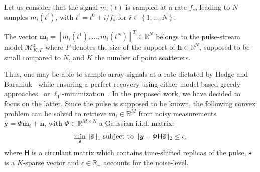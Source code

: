 \documentclass{article}
\newcommand{\vect}[1]{\bm{#1}}
\newcommand{\mat}[1]{\mathsf{#1}}
\newcommand{\ser}[2]{#1^{#2}}
\theoremstyle{definition}
\begin{document}
Let us consider that the signal $m_i \left(t\right)$ is sampled at a rate $f_s$, leading to $N$ samples $ m_i \left(\ser{t}{i}\right)$, with $\ser{t}{i}= \ser{t}{0} + i/f_s$ for $i \in \left\lbrace 1,\dots,N \right\rbrace$.

The vector $\vect{m}_i = \left[m_i\left(\ser{t}{1}\right),\dots,m_i\left(\ser{t}{N}\right)\right]^T \in \mathbb{R}^N$ belongs to the pulse-stream model $\mathcal{M}^z_{K,F}$ where $F$ denotes the size of the support of $\vect{h} \in \mathbb{R}^N$, supposed to be small compared to $N$, and $K$ the number of point scatterers.

Thus, one may be able to sample array signals at a rate dictated by Hedge and Baraniuk~\cite{Hedge_TSP_2011} while ensuring a perfect recovery using either model-based greedy approaches~\cite{Baraniuk2010} or $\ell_1$-minimization~\cite{candes11}. 
In the proposed work, we have decided to focus on the latter. Since the pulse is supposed to be known, the following convex problem can be solved to retrieve $\vect{m}_i \in \mathbb{R}^M$ from noisy measurements $\vect{y} = \mathsf{\Phi} \vect{m}_i + \vect{n}$, with $\mathsf{\Phi} \in \mathbb{R}^{M \times N}$ a Gaussian i.i.d. matrix:
\begin{equation}
\label{eq_l1_BPDN}
\min_{\bar{\vect{s}}}\|\bar{\vect{s}}\|_{1}
\textnormal{ subject to }\| \bm{y}-\mat{\Phi H}\bar{\vect{s}}\|_{2}\leq\epsilon,
\end{equation}
where $\mat{H}$ is a circulant matrix which contains time-shifted replicas of the pulse, $\vect{s}$ is a $K$-sparse vector and $\epsilon \in \mathbb{R}_{+}$ accounts for the noise-level.
\end{document}
